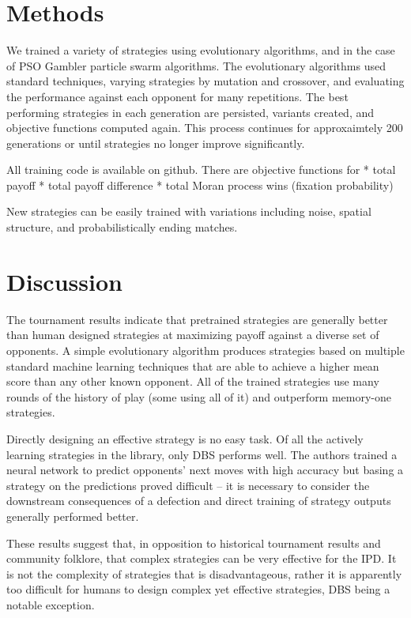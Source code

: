 \documentclass{article}
\begin{document}
\section{Methods}

We trained a variety of strategies using evolutionary algorithms, and in the
case of PSO Gambler particle swarm algorithms. The evolutionary algorithms
used standard techniques, varying strategies by mutation and crossover, and
evaluating the performance against each opponent for many repetitions. The
best performing strategies in each generation are persisted, variants created,
and objective functions computed again. This process continues for approxaimtely
200 generations or until strategies no longer improve significantly.


All training code is available on github. There are objective functions for
* total payoff
* total payoff difference
* total Moran process wins (fixation probability)

New strategies can be easily trained with variations including noise, spatial
structure, and probabilistically ending matches.

\section{Discussion}

The tournament results indicate that pretrained strategies are generally better
than human designed strategies at maximizing payoff against a diverse set of
opponents. A simple evolutionary algorithm produces strategies based on multiple
standard machine learning techniques that are able to achieve a higher mean
score than any other known opponent. All of the trained strategies use many
rounds of the history of play (some using all of it) and outperform memory-one
strategies.

Directly designing an effective strategy is no easy task. Of all the actively
learning strategies in the library, only DBS performs well. The authors trained
a neural network to predict opponents' next moves with high accuracy but basing
a strategy on the predictions proved difficult -- it is necessary to consider
the downstream consequences of a defection and direct training of strategy
outputs generally performed better.

These results suggest that, in opposition to historical tournament results
and community folklore, that complex strategies can be very effective for the
IPD. It is not the complexity of strategies that is disadvantageous, rather it
is apparently too difficult for humans to design complex yet effective
strategies, DBS being a notable exception.
\end{document}
